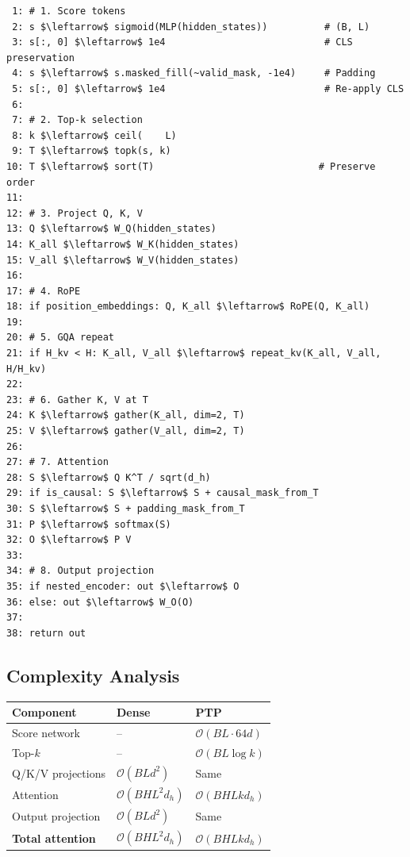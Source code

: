 {\begin{lstlisting}
 1: # 1. Score tokens
 2: s $\leftarrow$ sigmoid(MLP(hidden_states))          # (B, L)
 3: s[:, 0] $\leftarrow$ 1e4                            # CLS preservation
 4: s $\leftarrow$ s.masked_fill(~valid_mask, -1e4)     # Padding
 5: s[:, 0] $\leftarrow$ 1e4                            # Re-apply CLS
 6:
 7: # 2. Top-k selection
 8: k $\leftarrow$ ceil(    L)
 9: T $\leftarrow$ topk(s, k)
10: T $\leftarrow$ sort(T)                             # Preserve order
11:
12: # 3. Project Q, K, V
13: Q $\leftarrow$ W_Q(hidden_states)
14: K_all $\leftarrow$ W_K(hidden_states)
15: V_all $\leftarrow$ W_V(hidden_states)
16:
17: # 4. RoPE
18: if position_embeddings: Q, K_all $\leftarrow$ RoPE(Q, K_all)
19:
20: # 5. GQA repeat
21: if H_kv < H: K_all, V_all $\leftarrow$ repeat_kv(K_all, V_all, H/H_kv)
22:
23: # 6. Gather K, V at T
24: K $\leftarrow$ gather(K_all, dim=2, T)
25: V $\leftarrow$ gather(V_all, dim=2, T)
26:
27: # 7. Attention
28: S $\leftarrow$ Q K^T / sqrt(d_h)
29: if is_causal: S $\leftarrow$ S + causal_mask_from_T
30: S $\leftarrow$ S + padding_mask_from_T
31: P $\leftarrow$ softmax(S)
32: O $\leftarrow$ P V
33:
34: # 8. Output projection
35: if nested_encoder: out $\leftarrow$ O
36: else: out $\leftarrow$ W_O(O)
37:
38: return out
\end{lstlisting}

\subsection{Complexity Analysis}

\begin{table}[H]
\centering
\small
\begin{tabular}{lll}
\toprule
\textbf{Component} & \textbf{Dense} & \textbf{PTP} \\
\midrule
Score network & -- & $\mathcal{O}(B L \cdot 64 d)$ \\
Top-$k$ & -- & $\mathcal{O}(B L \log k)$ \\
Q/K/V projections & $\mathcal{O}(B L d^2)$ & Same \\
Attention & $\mathcal{O}(B H L^2 d_h)$ & \textbf{$\mathcal{O}(B H L k d_h)$} \\
Output projection & $\mathcal{O}(B L d^2)$ & Same \\
\textbf{Total attention} & $\mathcal{O}(B H L^2 d_h)$ & \textbf{$\mathcal{O}(B H L k d_h)$} \\
\bottomrule
\end{tabular}
\end{table}

}
